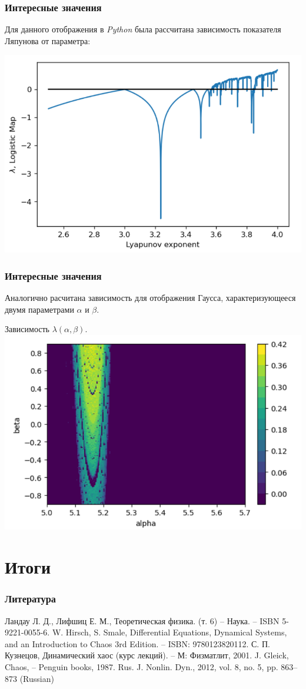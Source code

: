 \begin{frame}
	\frametitle{Интересные значения}

	Для данного отображения в \textit{Python} была рассчитана зависимость показателя Ляпунова от параметра:

	        \centering
        \includegraphics[width=0.6\linewidth]{img/lyap_exp.png}
\end{frame}

\begin{frame}
	\frametitle{Интересные значения}

	Аналогично расчитана зависимость для отображения Гаусса, характеризующееся двумя параметрами $\alpha$ и $\beta$.

\phantom{42}

	        \centering
	    Зависимость $\lambda (\alpha, \beta)$.\\
        \includegraphics[width=0.6\linewidth]{img/Gauss_map.png}
\end{frame}

\section{Итоги}

\begin{frame}
	\frametitle{Литература}

	\begin{thebibliography}{2}
Ландау Л. Д., Лифшиц Е. М., Теоретическая физика. (т. 6) -- Наука. -- ISBN 5-9221-0055-6.
W. Hirsch, S. Smale, Differential Equations, Dynamical Systems, and an Introduction to Chaos
3rd Edition. -- ISBN: 9780123820112.
С. П. Кузнецов, Динамический хаос (курс лекций). -- М: Физматлит, 2001.
J. Gleick, Chaos, -- Penguin books, 1987.
Rus. J. Nonlin. Dyn., 2012, vol. 8, no. 5, pp. 863–873 (Russian)
\end{thebibliography}
\end{frame}

